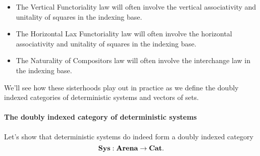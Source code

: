 \documentclass[DynamicalBook]{subfiles}
\begin{document}
\begin{itemize}
  \item The Vertical Functoriality law will often involve the vertical
    associativity and unitality of squares in the indexing base.
  \item The Horizontal Lax Functoriality law will often involve the horizontal
    associativity and unitality of squares in the indexing base.
  \item The Naturality of Compositors law will often involve the interchange law
    in the indexing base.
\end{itemize}

We'll see how these sisterhoods play out in practice as we define the doubly
indexed categories of deterministic systems and vectors of sets.

\paragraph{The doubly indexed category of deterministic systems}

Let's show that deterministic systems do indeed form a doubly indexed category
$$\textbf{Sys} : \textbf{Arena} \to \textbf{Cat}.$$
\end{document}
